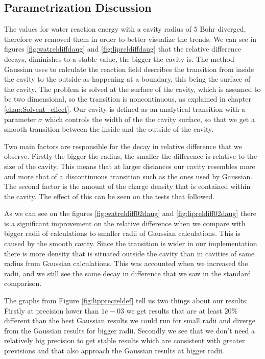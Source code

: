 \documentclass[../master_thesis.tex]{subfiles}
\begin{document}
\subsection{Parametrization Discussion}
The values for water reaction energy with a cavity radius of $5$ Bohr diverged, therefore
we removed them in order to better visualize the trends.
We can see in figures \ref{fig:watreldiffdaug} and \ref{fig:lipreldiffdaug}
that the relative difference decays, diminishes to a stable value, the bigger the cavity is. The method Gaussian
uses to calculate the reaction field describes the transition from inside the
cavity to the outside as happening at a boundary, this being the surface of the cavity.
The problem is solved at the surface of the cavity, which is assumed to be two dimensional,
so the transition is noncontinuous, as explained in chapter \ref{chap:Solvent_effect}.
Our cavity is defined as an analytical transition with a parameter $\sigma$ which
controls the width of the the cavity surface, so that we get a smooth transition
between the inside and the outside of the cavity.

Two main factors are responsible for the decay in relative difference that we observe.
Firstly the bigger the radius, the smaller the difference is relative to the
size of the cavity. This means that at larger distances our cavity resembles
more and more that of a discontinuous transition such as the ones used by
Gaussian. The second factor is the amount of the charge density that is contained within
the cavity. The effect of this can be seen on the tests that followed.

As we can see on the figures \ref{fig:watreldiff02daug} and \ref{fig:lipreldiff02daug}
there is a significant improvement on the relative difference when we compare with
bigger radii of \mrchem calculations to smaller radii of Gaussian calculations.
This is caused by the smooth cavity. Since the transition is wider in our implementation
there is more density that is situated outside the cavity than in cavities of same radius
from Gaussian calculations. This was accounted when we increased the radii, and we still
see the same decay in difference that we saw in the standard comparison.

The graphs from Figure \ref{fig:lipprecreldef} tell us two things about our results:
Firstly at precision lower than $1e-03$ we get results that are at least $20\%$ different
than the best Gaussian results we could run for small radii and diverge from the
Gaussian results for bigger radii. Secondly we see that we don't need a relatively big
precision to get stable results which are consistent with greater previsions and
that also approach the Gaussian results at bigger radii.
\end{document}
